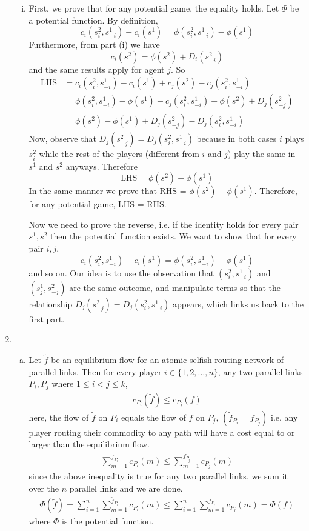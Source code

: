 \documentclass[a4paper,12pt]{article}
\theoremstyle{definition}
\begin{document}
\begin{enumerate}
\begin{enumerate}[(i)]
\item
First, we prove that for any potential game, the equality holds. Let $\Phi$ be a potential function. By definition,
\[ c_i(s^2_i, s^1_{-i}) - c_i(s^1) = \phi(s^2_i,s^1_{-i}) - \phi(s^1)\]
Furthermore, from part (i) we have
\[ c_i(s^2) = \phi(s^2) + D_i(s^2_{-i}) \]
and the same results apply for agent $j$. So
\begin{align*}
\text{LHS} &= c_i(s^2_i,s^1_{-i})-c_i(s^1)+c_j(s^2)-c_j(s^2_i,s^1_{-i})\\
&=\phi(s^2_i,s^1_{-i})-\phi(s^1) -c_j(s^2_i,s^1_{-i}) + \phi(s^2)+D_j(s^2_{-j}) \\
&= \phi(s^2)-\phi(s^1) + D_j(s^2_{-j}) - D_j(s^2_i, s^1_{-i})
\end{align*}
Now, observe that $D_j(s^2_{-j})=D_j(s^2_i, s^1_{-i})$ because in both cases $i$ plays $s_i^2$ while the rest of the players (different from $i$ and $j$) play the same in $s^1$ and $s^2$ anyways. Therefore
\[ \text{LHS}= \phi(s^2)-\phi(s^1)\]
In the same manner we prove that RHS = $\phi(s^2)-\phi(s^1)$. Therefore, for any potential game, LHS = RHS.

Now we need to prove the reverse, i.e. if the identity holds for every pair $s^1, s^2$ then the potential function exists. We want to show that for every pair $i,j$, 
\[c_i(s^2_i, s^1_{-i}) - c_i(s^1) = \phi(s^2_i, s^1_{-i}) - \phi(s^1)\] 
and so on. Our idea is to use the observation that $(s^2_i, s^1_{-i})$ and $(s^1_j, s^2_{-j})$ are the same outcome, and manipulate terms so that the relationship $D_j(s^2_{-j})=D_j(s^2_i, s^1_{-i})$ appears, which links us back to the first part.
\end{enumerate}

\item
\begin{enumerate}[(a)]
\item Let $\tilde{f}$ be an equilibrium flow for an atomic selfish routing network of parallel links. Then for every player $i \in \{1,2,\ldots, n\}$, any two parallel links $P_i,P_j$ where $1\leq i < j \leq k$,
\begin{align*}
c_{P_i}(\tilde{f})\leq c_{P_j}(f)
\end{align*}
here, the flow of $\tilde{f}$ on $P_i$ equals the flow of $f$ on $P_j$, $(\tilde{f}_{P_i}=f_{P_j})$ i.e. any player routing their commodity to any path will have a cost equal to or larger than the equilibrium flow.
\begin{align*}
\sum_{m=1}^{\tilde{f}_{P_i}}c_{P_i}(m)\leq \sum_{m=1}^{f_{P_j}}c_{P_j}(m)
\end{align*}
since the above inequality is true for any two parallel links, we sum it over the $n$ parallel links and we are done.
\begin{align*}
\Phi(\tilde{f})=\sum_{i=1}^{n}\sum_{m=1}^{\tilde{f}_{P_i}}c_{P_i}(m)\leq \sum_{i=1}^{n}\sum_{m=1}^{f_{P_i}}c_{P_j}(m)=\Phi(f)
\end{align*}
where $\Phi$ is the potential function.


\end{enumerate}
\end{enumerate}
\end{document}
